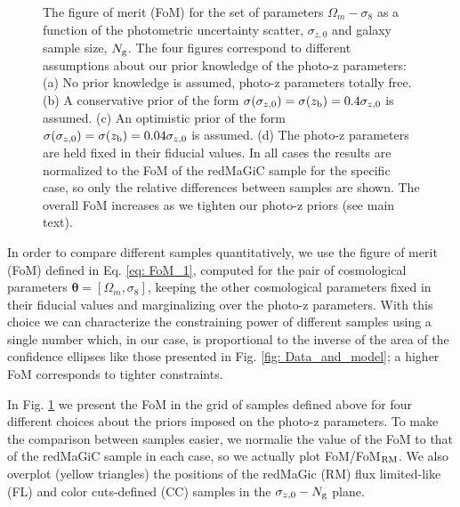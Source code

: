 \documentclass[a4paper,fleqn,usenatbib]{mnras}
\begin{document}
\begin{figure*}
\centering
{}%

\caption{The figure of merit (FoM) for the set of parameters $\Omega_m - \sigma_8$ as a function of the photometric uncertainty scatter, $\sigma_{z,0}$ and galaxy sample size, $N_{\mbox{\scriptsize{g}}}$. The four figures correspond to different assumptions about our prior knowledge of the photo-z parameters: (a) No prior knowledge is assumed, photo-z parameters totally free. (b) A conservative prior of the form $\sigma(\sigma_{z,0}) = \sigma(z_{\mbox{\scriptsize{b}}}) = 0.4\sigma_{z,0}$ is assumed. (c) An optimistic prior of the form $\sigma(\sigma_{z,0}) = \sigma(z_{\mbox{\scriptsize{b}}}) = 0.04\sigma_{z,0}$ is assumed. (d) The photo-z parameters are held fixed in their fiducial values. In all cases the results are normalized to the FoM of the redMaGiC sample for the specific case, so only the relative differences between samples are shown. The overall FoM increases as we tighten our photo-z  priors (see main text).}
\label{fig: Baseline}
\end{figure*}

In order to compare different samples quantitatively, we use the figure of merit (FoM) defined in Eq. \eqref{eq: FoM_1}, computed for the pair of cosmological parameters $\mathbf{\theta} =[ \Omega_m, \sigma_8]$, keeping the other cosmological parameters fixed in their fiducial values and marginalizing over the photo-z parameters. With this choice we can characterize the constraining power of different samples using a single number which, in our case, is proportional to the inverse of the area of the confidence ellipses like those presented in Fig. \ref{fig: Data_and_model}; a higher FoM corresponds to tighter constraints.

In Fig. \ref{fig: Baseline} we present the FoM in the grid of samples defined above for four different choices about the priors imposed on the photo-z parameters. To make the comparison between samples easier, we normalie the value of the FoM to that of the redMaGiC sample in each case, so we actually plot FoM/FoM$_{\mbox{\scriptsize{RM}}}$. We also overplot (yellow triangles) the positions of the redMaGic (RM) flux limited-like (FL) and color cuts-defined (CC) samples in the $\sigma_{z,0} - N_{\mbox{\scriptsize{g}}} $ plane. 
\end{document}

